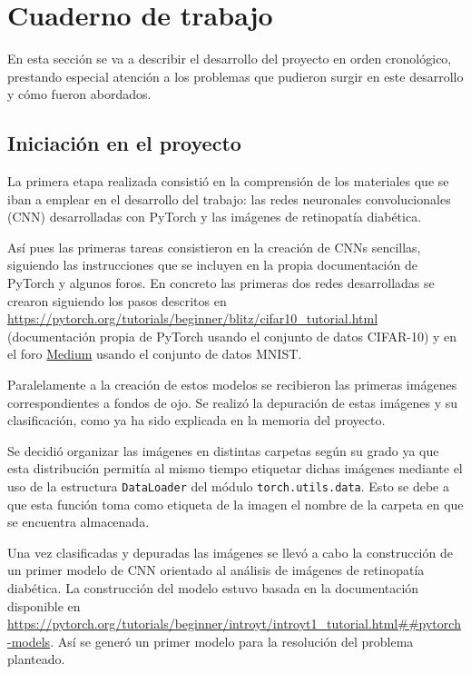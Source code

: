 
\section{Cuaderno de trabajo}

En esta sección se va a describir el desarrollo del proyecto en orden cronológico, prestando especial atención a los problemas que pudieron surgir en este desarrollo y cómo fueron abordados.

\subsection{Iniciación en el proyecto}

La primera etapa realizada consistió en la comprensión de los materiales que se iban a emplear en el desarrollo del trabajo: las redes neuronales convolucionales (CNN) desarrolladas con PyTorch y las imágenes de retinopatía diabética.

Así pues las primeras tareas consistieron en la creación de CNNs sencillas, siguiendo las instrucciones que se incluyen en la propia documentación de PyTorch y algunos foros. En concreto las primeras dos redes desarrolladas se crearon siguiendo los pasos descritos en \url{https://pytorch.org/tutorials/beginner/blitz/cifar10_tutorial.html} (documentación propia de PyTorch usando el conjunto de datos CIFAR-10) y en el foro \href{https://medium.com/@nutanbhogendrasharma/pytorch-convolutional-neural-network-with-mnist-dataset-4e8a4265e118}{Medium} usando el conjunto de datos MNIST.

Paralelamente a la creación de estos modelos se recibieron las primeras imágenes correspondientes a fondos de ojo. Se realizó la depuración de estas imágenes y su clasificación, como ya ha sido explicada en la memoria del proyecto.

Se decidió organizar las imágenes en distintas carpetas según su grado ya que esta distribución permitía al mismo tiempo etiquetar dichas imágenes mediante el uso de la estructura \texttt{DataLoader} del módulo \texttt{torch.utils.data}. Esto se debe a que esta función toma como etiqueta de la imagen el nombre de la carpeta en que se encuentra almacenada.

Una vez clasificadas y depuradas las imágenes se llevó a cabo la construcción de un primer modelo de CNN orientado al análisis de imágenes de retinopatía diabética. La construcción del modelo estuvo basada en la documentación disponible en \url{https://pytorch.org/tutorials/beginner/introyt/introyt1_tutorial.html##pytorch-models}. Así se generó un primer modelo para la resolución del problema planteado.


